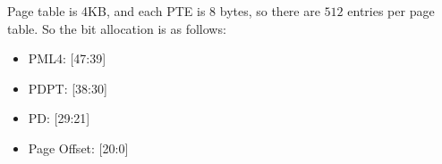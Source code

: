\begin{parts}
    Page table is 4KB, and each PTE is 8 bytes, so there are $512$ entries per page table. So the bit allocation is as follows:\\
    \begin{itemize}[leftmargin=*]
        \item PML4: [47:39]
        \item PDPT: [38:30]
        \item PD: [29:21]
        \item Page Offset: [20:0]
    \end{itemize}

\end{parts}
